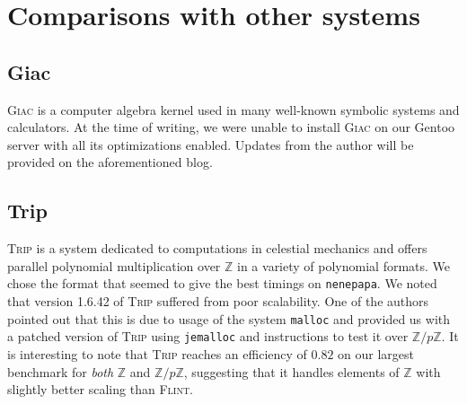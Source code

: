 \documentclass{deliverablereport}
\begin{document}
\section{Comparisons with other systems}
\subsection{Giac}
\textsc{Giac} \cite{Giac} is a computer algebra kernel used in many
well-known symbolic systems and calculators. At the time of writing,
we were unable to install \textsc{Giac} on our Gentoo server with all
its optimizations enabled. Updates from the author will be provided
on the aforementioned blog.

\subsection{Trip}
\textsc{Trip} \cite{Gastineau:2011:TCA:1940475.1940518} is a system dedicated to computations in celestial mechanics and offers parallel polynomial multiplication over $\mathbb{Z}$ in a variety of polynomial formats. We chose the format that seemed to give the best timings on {\tt nenepapa}. We noted that version 1.6.42 of \textsc{Trip} suffered from poor scalability. One of the authors pointed out that this is due to usage of the system {\tt malloc} and provided us with a patched version of \textsc{Trip} using {\tt jemalloc} and instructions to test it over $\mathbb{Z}/p\mathbb{Z}$. It is interesting to note that \textsc{Trip} reaches an efficiency of $0.82$ on our largest benchmark for \emph{both} $\mathbb{Z}$ and $\mathbb{Z}/p\mathbb{Z}$, suggesting that it handles elements of $\mathbb{Z}$ with slightly better scaling than \textsc{Flint}.
\end{document}
